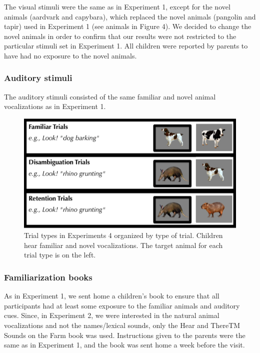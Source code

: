 \documentclass[english,floatsintext,man]{apa6}
\theoremstyle{definition}
\theoremstyle{definition}
\theoremstyle{definition}
\theoremstyle{remark}
\begin{document}
The visual stimuli were the same as in Experiment 1, except for the
novel animals (aardvark and capybara), which replaced the novel animals
(pangolin and tapir) used in Experiment 1 (see animals in Figure 4). We
decided to change the novel animals in order to confirm that our results
were not restricted to the particular stimuli set in Experiment 1. All
children were reported by parents to have had no exposure to the novel
animals.

\hypertarget{auditory-stimuli-1}{%
\subsubsection{Auditory stimuli}\label{auditory-stimuli-1}}

The auditory stimuli consisted of the same familiar and novel animal
vocalizations as in Experiment 1.

\begin{figure}[tb]
\includegraphics[width=0.95\linewidth]{anime_manuscript_files/figure-latex/stimuli-e2-1} \caption{Trial types in Experiments 4 organized by type of trial. Children hear familiar and novel vocalizations. The target animal for each trial type is on the left.}\label{fig:stimuli-e2}
\end{figure}

\hypertarget{familiarization-books-1}{%
\subsubsection{Familiarization books}\label{familiarization-books-1}}

As in Experiment 1, we sent home a children's book to ensure that all
participants had at least some exposure to the familiar animals and
auditory cues. Since, in Experiment 2, we were interested in the natural
animal vocalizations and not the names/lexical sounds, only the Hear and
ThereTM Sounds on the Farm book was used. Instructions given to the
parents were the same as in Experiment 1, and the book was sent home a
week before the visit.
\end{document}
